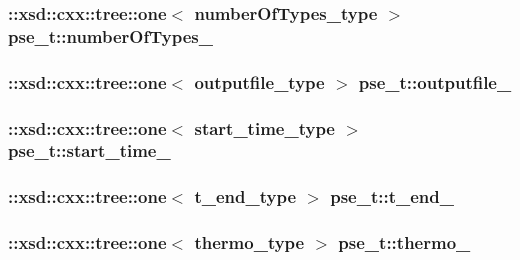 \hypertarget{classpse__t_add66389e6101c9db5136551a05426f1f}{
\subsubsection[{number\-Of\-Types\-\_\-}]{\setlength{\rightskip}{0pt plus 5cm}\-::xsd\-::cxx\-::tree\-::one$<$ {\bf number\-Of\-Types\-\_\-type} $>$ pse\-\_\-t\-::number\-Of\-Types\-\_\-\hspace{0.3cm}{\ttfamily [protected]}}}\label{classpse__t_add66389e6101c9db5136551a05426f1f}
\hypertarget{classpse__t_a81e5b212ed8936e46720248274c67d9f}{
\subsubsection[{outputfile\-\_\-}]{\setlength{\rightskip}{0pt plus 5cm}\-::xsd\-::cxx\-::tree\-::one$<$ {\bf outputfile\-\_\-type} $>$ pse\-\_\-t\-::outputfile\-\_\-\hspace{0.3cm}{\ttfamily [protected]}}}\label{classpse__t_a81e5b212ed8936e46720248274c67d9f}
\hypertarget{classpse__t_a3c0371b1f824a3c8b16d1b076afd456c}{
\subsubsection[{start\-\_\-time\-\_\-}]{\setlength{\rightskip}{0pt plus 5cm}\-::xsd\-::cxx\-::tree\-::one$<$ {\bf start\-\_\-time\-\_\-type} $>$ pse\-\_\-t\-::start\-\_\-time\-\_\-\hspace{0.3cm}{\ttfamily [protected]}}}\label{classpse__t_a3c0371b1f824a3c8b16d1b076afd456c}
\hypertarget{classpse__t_a751791f6389581ad98c18e14ec318325}{
\subsubsection[{t\-\_\-end\-\_\-}]{\setlength{\rightskip}{0pt plus 5cm}\-::xsd\-::cxx\-::tree\-::one$<$ {\bf t\-\_\-end\-\_\-type} $>$ pse\-\_\-t\-::t\-\_\-end\-\_\-\hspace{0.3cm}{\ttfamily [protected]}}}\label{classpse__t_a751791f6389581ad98c18e14ec318325}
\hypertarget{classpse__t_aae4e2724ad2d21705a74891b90e6446c}{
\subsubsection[{thermo\-\_\-}]{\setlength{\rightskip}{0pt plus 5cm}\-::xsd\-::cxx\-::tree\-::one$<$ {\bf thermo\-\_\-type} $>$ pse\-\_\-t\-::thermo\-\_\-\hspace{0.3cm}{\ttfamily [protected]}}}\label{classpse__t_aae4e2724ad2d21705a74891b90e6446c}


